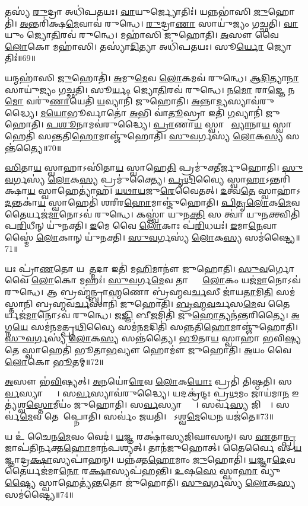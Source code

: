 𑌤𑌸𑍍𑌯॑ \ul{𑌰𑍁}𑌦𑍍𑌰𑌾 𑌅𑌧𑌿॑𑌪𑌤𑌯𑌃।
\ul{𑌵𑌾}𑌯𑍁𑌰𑍍𑌜𑍍𑌯𑍋𑌤𑌿𑌃॑।
𑌯𑌨𑍍𑌨𑌭𑌾॑𑌸𑌿 \ul{𑌜𑍁}𑌹𑍋𑌤𑌿॑।
\ul{𑌅}𑌨𑍍𑌤𑌰𑌿॑𑌕𑍍𑌷\ul{𑌮𑍇}𑌵𑌾𑌵॑ 𑌰𑍁𑌨𑍍𑌧𑍇।
\ul{𑌰𑍁}𑌦𑍍𑌰𑌾\ul{𑌣𑌾}\ul{} 𑌸𑌾𑌯𑍁॑𑌜𑍍𑌯𑌂 𑌗𑌚𑍍𑌛𑌤𑌿।
\ul{𑌵𑌾}𑌯𑍁𑌂 𑌜𑍍𑌯𑍋\ul{𑌤𑌿}𑌰𑌵॑ 𑌰𑍁𑌨𑍍𑌧𑍇।
𑌮𑌹𑌾॑𑌸𑌿 𑌜𑍁𑌹𑍋𑌤𑌿।
\ul{𑌅}𑌸𑍗 𑌵𑍈 \ul{𑌲𑍋}𑌕𑍋 𑌮𑌹𑌾॑𑌸𑌿।
𑌤𑌸𑍍𑌯𑌾॑\ul{𑌦𑌿}𑌤𑍍𑌯𑌾 𑌅𑌧𑌿॑𑌪𑌤𑌯𑌃।
𑌸𑍂\ul{𑌰𑍍𑌯𑍋} 𑌜𑍍𑌯𑍋𑌤𑌿𑌃॑॥69॥

𑌯𑌨𑍍𑌮𑌹𑌾॑𑌸𑌿 \ul{𑌜𑍁}𑌹𑍋𑌤𑌿॑।
\ul{𑌅}𑌮𑍁\ul{𑌮𑍇}𑌵 \ul{𑌲𑍋}𑌕𑌮𑌵॑ 𑌰𑍁𑌨𑍍𑌧𑍇।
\ul{𑌆}\ul{𑌦𑌿}𑌤𑍍𑌯𑌾\ul{𑌨𑌾}\ul{} 𑌸𑌾𑌯𑍁॑𑌜𑍍𑌯𑌂 𑌗𑌚𑍍𑌛𑌤𑌿।
𑌸𑍂\ul{𑌰𑍍𑌯𑌂} 𑌜𑍍𑌯𑍋\ul{𑌤𑌿}𑌰𑌵॑ 𑌰𑍁𑌨𑍍𑌧𑍇।
𑌨\ul{𑌮𑍋} 𑌰𑌾\ul{𑌜𑍍𑌞𑍇} 𑌨\ul{𑌮𑍋} 𑌵𑌰𑍁॑\ul{𑌣𑌾}𑌯𑍇𑌤𑌿॑ \ul{𑌯}𑌵𑍍𑌯𑌾𑌨𑌿॑ 𑌜𑍁𑌹𑍋𑌤𑌿।
\ul{𑌅}𑌨𑍍𑌨𑌾\ul{𑌦𑍍𑌯}𑌸𑍍𑌯𑌾𑌵॑𑌰𑍁𑌦𑍍𑌧𑍍𑌯𑍈।
\ul{𑌮}\ul{𑌯𑍋}𑌭𑍂𑌰𑍍𑌵𑌾𑌤𑍋॑ \ul{𑌅}𑌭𑌿 𑌵𑌾॑\ul{𑌤𑍂}𑌸𑍍𑌰𑌾 𑌇𑌤𑌿॑ \ul{𑌗}𑌵𑍍𑌯𑌾𑌨𑌿॑ 𑌜𑍁𑌹𑍋𑌤𑌿।
\ul{𑌪}\ul{𑌶𑍂}𑌨𑌾𑌮𑌵॑𑌰𑍁𑌦𑍍𑌧𑍍𑌯𑍈।
\ul{𑌪𑍍𑌰𑌾}𑌣𑌾\ul{𑌯} 𑌸𑍍𑌵𑌾𑌹𑌾᳚ \ul{𑌵𑍍𑌯𑌾}𑌨𑌾\ul{𑌯} 𑌸𑍍𑌵𑌾𑌹𑍇𑌤𑌿॑ 𑌸𑌨𑍍𑌤𑌤𑌿\ul{𑌹𑍋}𑌮𑌾𑌞𑍍𑌜𑍁॑𑌹𑍋𑌤𑌿।
\ul{𑌸𑍁}\ul{𑌵}𑌰𑍍𑌗𑌸𑍍𑌯॑ \ul{𑌲𑍋}𑌕\ul{𑌸𑍍𑌯} 𑌸𑌨𑍍𑌤॑𑌤𑍍𑌯𑍈॥70॥

\ul{𑌸𑌿}𑌤𑌾\ul{𑌯} 𑌸𑍍𑌵𑌾𑌹𑌾\-𑌽𑌸𑌿॑𑌤𑌾\ul{𑌯} 𑌸𑍍𑌵𑌾𑌹𑍇\ul{𑌤𑌿} 𑌪𑍍𑌰𑌮𑍁॑𑌕𑍍𑌤𑍀𑌰𑍍𑌜𑍁𑌹𑍋𑌤𑌿।
\ul{𑌸𑍁}\ul{𑌵}𑌰𑍍𑌗𑌸𑍍𑌯॑ \ul{𑌲𑍋}𑌕\ul{𑌸𑍍𑌯} 𑌪𑍍𑌰𑌮𑍁॑𑌕𑍍𑌤𑍍𑌯𑍈।
\ul{𑌪𑍃}\ul{𑌥𑌿}𑌵𑍍𑌯𑍈 𑌸𑍍𑌵𑌾\ul{𑌹𑌾}\-𑌽𑌨𑍍𑌤𑌰𑌿॑𑌕𑍍𑌷𑌾\ul{𑌯} 𑌸𑍍𑌵𑌾𑌹𑍇𑌤𑍍𑌯𑌾॑𑌹।
\ul{𑌯}\ul{𑌥𑌾}\ul{𑌯}𑌜𑍁\ul{𑌰𑍇}𑌵𑍈𑌤𑌤𑍍।
\ul{𑌦}𑌤𑍍𑌵\ul{𑌤𑍇} 𑌸𑍍𑌵𑌾𑌹𑌾॑\-𑌽\ul{𑌦}𑌨𑍍𑌤𑌕𑌾॑\ul{𑌯} 𑌸𑍍𑌵𑌾𑌹𑍇𑌤𑌿॑ 𑌶𑌰𑍀𑌰\ul{𑌹𑍋}𑌮𑌾𑌞𑍍𑌜𑍁॑𑌹𑍋𑌤𑌿।
\ul{𑌪𑌿}\ul{𑌤𑍃}\ul{𑌲𑍋}𑌕\ul{𑌮𑍇}𑌵 𑌤𑍈𑌰𑍍𑌯𑌜॑\ul{𑌮𑌾}𑌨𑍋𑌽𑌵॑ 𑌰𑍁𑌨𑍍𑌧𑍇।
𑌕𑌸𑍍𑌤𑍍𑌵𑌾॑ 𑌯𑍁𑌨\ul{𑌕𑍍𑌤𑌿} 𑌸 𑌤𑍍𑌵𑌾॑ 𑌯𑍁\ul{𑌨}𑌕𑍍𑌤𑍍𑌵𑌿𑌤𑌿॑ 𑌪\ul{𑌰𑌿}𑌧𑍀𑌨𑍍 𑌯𑍁॑𑌨𑌕𑍍𑌤𑌿।
\ul{𑌇}𑌮𑍇 𑌵𑍈 \ul{𑌲𑍋}𑌕𑌾𑌃 𑌪॑\ul{𑌰𑌿}𑌧𑌯𑌃॑।
\ul{𑌇}𑌮𑌾\ul{𑌨𑍇}𑌵𑌾𑌸𑍍𑌮𑍈॑ \ul{𑌲𑍋}𑌕𑌾𑌨𑍍 𑌯𑍁॑𑌨𑌕𑍍𑌤𑌿।
\ul{𑌸𑍁}\ul{𑌵}𑌰𑍍𑌗𑌸𑍍𑌯॑ \ul{𑌲𑍋}𑌕\ul{𑌸𑍍𑌯} 𑌸𑌮॑𑌷𑍍𑌟𑍍𑌯𑍈॥71॥

𑌯𑌃 𑌪𑍍𑌰𑌾॑\ul{𑌣}𑌤𑍋 𑌯 𑌆᳚\ul{𑌤𑍍𑌮}𑌦𑌾 𑌇𑌤𑌿॑ 𑌮\ul{𑌹𑌿}𑌮𑌾𑌨𑍗॑ 𑌜𑍁𑌹𑍋𑌤𑌿।
\ul{𑌸𑍁}\ul{𑌵}𑌰𑍍𑌗𑍋 𑌵𑍈 \ul{𑌲𑍋}𑌕𑍋 𑌮𑌹𑌃॑।
\ul{𑌸𑍁}\ul{𑌵}𑌰𑍍𑌗\ul{𑌮𑍇}𑌵 𑌤𑌾𑌭𑍍𑌯𑌾𑌂᳚ \ul{𑌲𑍋}𑌕𑌂 𑌯𑌜॑\ul{𑌮𑌾}𑌨𑍋𑌽𑌵॑ 𑌰𑍁𑌨𑍍𑌧𑍇।
𑌆 𑌬𑍍𑌰𑌹𑍍𑌮॑𑌨𑍍𑌬𑍍𑌰𑌾\ul{𑌹𑍍𑌮}𑌣𑍋 𑌬𑍍𑌰॑𑌹𑍍𑌮𑌵\ul{𑌰𑍍𑌚}𑌸𑍀 𑌜𑌾॑𑌯\ul{𑌤𑌾}𑌮𑌿\ul{𑌤𑌿} 𑌸𑌮॑𑌸𑍍𑌤𑌾𑌨𑌿 𑌬𑍍𑌰𑌹𑍍𑌮𑌵\ul{𑌰𑍍𑌚}𑌸𑌾𑌨𑌿॑ 𑌜𑍁𑌹𑍋𑌤𑌿।
\ul{𑌬𑍍𑌰}\ul{𑌹𑍍𑌮}\ul{𑌵}𑌰𑍍𑌚𑌸\ul{𑌮𑍇}𑌵 𑌤𑍈𑌰𑍍𑌯𑌜॑\ul{𑌮𑌾}𑌨𑍋𑌽𑌵॑ 𑌰𑍁𑌨𑍍𑌧𑍇।
𑌜\ul{𑌜𑍍𑌞𑌿} 𑌬𑍀\ul{𑌜}𑌮𑌿𑌤𑌿॑ 𑌜𑍁\ul{𑌹𑍋}𑌤𑍍𑌯𑌨॑𑌨𑍍𑌤𑌰𑌿𑌤𑍍𑌯𑍈।
\ul{𑌅}𑌗𑍍𑌨\ul{𑌯𑍇} 𑌸𑌮॑𑌨𑌮𑌤𑍍𑌪𑍃\ul{𑌥𑌿}𑌵𑍍𑌯𑍈 𑌸𑌮॑𑌨\ul{𑌮}𑌦𑌿𑌤𑌿॑ 𑌸𑌨𑍍𑌨𑌤𑌿\ul{𑌹𑍋}𑌮𑌾𑌞𑍍𑌜𑍁॑𑌹𑍋𑌤𑌿।
\ul{𑌸𑍁}\ul{𑌵}𑌰𑍍𑌗𑌸𑍍𑌯॑ \ul{𑌲𑍋}𑌕\ul{𑌸𑍍𑌯} 𑌸𑌨𑍍𑌨॑𑌤𑍍𑌯𑍈।
\ul{𑌭𑍂}𑌤𑌾\ul{𑌯} 𑌸𑍍𑌵𑌾𑌹𑌾॑ 𑌭𑌵𑌿\ul{𑌷𑍍𑌯}𑌤𑍇 𑌸𑍍𑌵𑌾𑌹𑍇𑌤𑌿॑ 𑌭𑍂𑌤𑌾\ul{𑌭}𑌵𑍍𑌯𑍗 𑌹𑍋𑌮𑍗॑ 𑌜𑍁𑌹𑍋𑌤𑌿।
\ul{𑌅}𑌯𑌂 𑌵𑍈 \ul{𑌲𑍋}𑌕𑍋 \ul{𑌭𑍂}𑌤𑌮𑍍॥72॥

\ul{𑌅}𑌸𑍗 𑌭॑\ul{𑌵𑌿}𑌷𑍍𑌯𑌤𑍍।
\ul{𑌅}𑌨𑌯𑍋॑\ul{𑌰𑍇}𑌵 \ul{𑌲𑍋}𑌕\ul{𑌯𑍋𑌃} 𑌪𑍍𑌰𑌤𑌿॑ 𑌤𑌿𑌷𑍍𑌠𑌤𑌿।
𑌸\ul{𑌰𑍍𑌵}𑌸𑍍𑌯𑌾𑌪𑍍𑌤𑍍𑌯𑍈᳚।
𑌸\ul{𑌰𑍍𑌵}𑌸𑍍𑌯𑌾𑌵॑𑌰𑍁𑌦𑍍𑌧𑍍𑌯𑍈।
𑌯𑌦𑌕𑍍𑌰॑𑌨𑍍𑌦𑌃 𑌪𑍍𑌰\ul{𑌥}𑌮𑌂 𑌜𑌾𑌯॑𑌮𑌾\ul{𑌨} 𑌇𑌤𑍍𑌯॑𑌶𑍍𑌵\ul{𑌸𑍍𑌤𑍋}𑌮𑍀𑌯𑌂॑ 𑌜𑍁𑌹𑍋𑌤𑌿।
𑌸\ul{𑌰𑍍𑌵}𑌸𑍍𑌯𑌾𑌪𑍍𑌤𑍍𑌯𑍈᳚।
𑌸𑌰𑍍𑌵॑\ul{𑌸𑍍𑌯} 𑌜𑌿𑌤𑍍𑌯𑍈᳚।
𑌸𑌰𑍍𑌵॑\ul{𑌮𑍇}𑌵 𑌤𑍇𑌨𑌾᳚𑌪𑍍𑌨𑍋𑌤𑌿।
𑌸𑌰𑍍𑌵𑌂॑ 𑌜𑌯𑌤𑌿।
𑌯𑍋᳚𑌽𑌶𑍍𑌵\ul{𑌮𑍇}𑌧𑍇\ul{𑌨} 𑌯𑌜॑𑌤𑍇॥73॥

𑌯 𑌉॑ 𑌚𑍈𑌨\ul{𑌮𑍇}𑌵𑌂 𑌵𑍇𑌦॑।
\ul{𑌯}𑌜𑍍𑌞 𑌰𑌕𑍍𑌷𑌾॑𑌸𑍍𑌯𑌜𑌿𑌘𑌾𑌸𑌨𑍍।
𑌸 \ul{𑌏}𑌤𑌾\ul{𑌨𑍍𑌪𑍍𑌰}𑌜𑌾𑌪॑𑌤𑌿𑌰𑍍𑌨𑌕𑍍𑌤\ul{𑌹𑍋}𑌮𑌾𑌨॑𑌪𑌶𑍍𑌯𑌤𑍍।
𑌤𑌾𑌨॑𑌜𑍁𑌹𑍋𑌤𑍍।
𑌤𑍈𑌰𑍍𑌵𑍈 𑌸 \ul{𑌯}𑌜𑍍𑌞𑌾𑌦𑍍𑌰\ul{𑌕𑍍𑌷𑌾}\ul{}𑌸𑍍𑌯𑌪𑌾॑𑌹𑌨𑍍।
𑌯𑌨𑍍𑌨॑𑌕𑍍𑌤\ul{𑌹𑍋}𑌮𑌾𑌂 \ul{𑌜𑍁}𑌹𑍋𑌤𑌿॑।
\ul{𑌯}𑌜𑍍𑌞𑌾\ul{𑌦𑍇}𑌵 𑌤𑍈𑌰𑍍𑌯𑌜॑𑌮𑌾\ul{𑌨𑍋} 𑌰\ul{𑌕𑍍𑌷𑌾}\ul{}𑌸𑍍𑌯𑌪॑𑌹𑌨𑍍𑌤𑌿।
\ul{𑌉}𑌷\ul{𑌸𑍇} 𑌸𑍍𑌵𑌾\ul{𑌹𑌾} 𑌵𑍍𑌯𑍁॑\ul{𑌷𑍍𑌟𑍍𑌯𑍈} 𑌸𑍍𑌵𑌾𑌹𑍇𑌤𑍍𑌯॑\ul{𑌨𑍍𑌤}𑌤𑍋 𑌜𑍁॑𑌹𑍋𑌤𑌿।
\ul{𑌸𑍁}\ul{𑌵}𑌰𑍍𑌗𑌸𑍍𑌯॑ \ul{𑌲𑍋}𑌕\ul{𑌸𑍍𑌯} 𑌸𑌮॑𑌷𑍍𑌟𑍍𑌯𑍈॥74॥\anuvakamend[𑌵𑍈 𑌨𑌭𑌾\dng{ꣳ}॑\ul{𑌸𑌿} 𑌸𑍂\ul{𑌰𑍍𑌯𑍋} 𑌜𑍍𑌯𑍋\ul{𑌤𑌿𑌃} 𑌸𑌨𑍍𑌤॑\ul{𑌤𑍍𑌯𑍈} 𑌸𑌮॑𑌷𑍍𑌟𑍍𑌯𑍈 \ul{𑌭𑍂}𑌤𑌂 𑌯𑌜॑\ul{𑌤𑍇} 𑌨𑌵॑ 𑌚]

